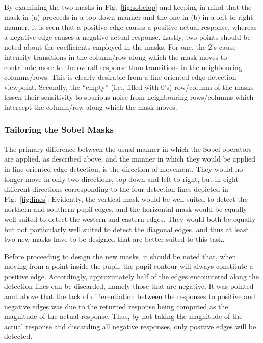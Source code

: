 By examining the two masks in Fig.~\ref{fig:sobelop} and keeping in
mind that the mask in (a) proceeds in a top-down manner and the one in
(b) in a left-to-right manner, it is seen that a positive edge causes
a positive actual response, whereas a negative edge causes a negative
actual response.  Lastly, two points should be noted about the
coefficients employed in the masks.  For one, the 2's cause intensity
transitions in the column/row along which the mask moves to contribute
more to the overall response than transitions in the neighbouring
columns/rows.  This is clearly desirable from a line oriented edge
detection viewpoint.  Secondly, the ``empty'' (i.e., filled with 0's)
row/column of the masks lessen their sensitivity to spurious noise
from neighbouring rows/columns which intercept the column/row along
which the mask moves.


\subsubsection{Tailoring the Sobel Masks}

The primary difference between the usual manner in which the Sobel
operators are applied, as described above, and the manner in which
they would be applied in line oriented edge detection, is the
direction of movement.  They would no longer move in only two
directions, top-down and left-to-right, but in eight different
directions corresponding to the four detection lines depicted in
Fig.~\ref{fig:lines}.  Evidently, the vertical mask would be well
suited to detect the northern and southern pupil edges, and the
horizontal mask would be equally well suited to detect the western and
eastern edges.  They would both be equally but not particularly well
suited to detect the diagonal edges, and thus at least two new masks
have to be designed that are better suited to this task.

Before proceeding to design the new masks, it should be noted that,
when moving from a point inside the pupil, the pupil contour will
always constitute a positive edge.  Accordingly, approximately half of
the edges encountered along the detection lines can be discarded,
namely those that are negative.  It was pointed aout above that the
lack of differentiation between the responses to positive and negative
edges was due to the returned response being computed as the magnitude
of the actual response.  Thus, by not taking the magnitude of the
actual response and discarding all negative responses, only positive
edges will be detected.

